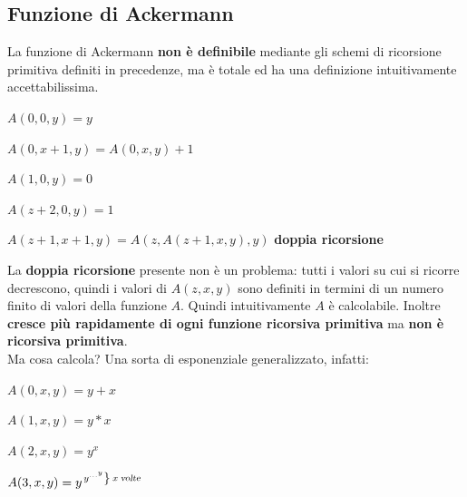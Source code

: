 \documentclass[10pt]{book}
\begin{document}
\subsection{Funzione di Ackermann}
La funzione di Ackermann \textbf{non è definibile} mediante gli schemi di ricorsione primitiva definiti in precedenze, ma è totale ed ha una definizione intuitivamente accettabilissima.

\begin{list}{}{}
	\item $A(0, 0, y) = y$
	\item $A(0, x + 1, y) = A(0, x, y) + 1$
	\item $A(1, 0, y) = 0$
	\item $A(z + 2, 0, y) = 1$
	\item $A(z + 1, x + 1, y) = A(z, A(z + 1, x, y), y)$ \textbf{doppia ricorsione}

\end{list}
La \textbf{doppia ricorsione} presente non è un problema: tutti i valori su cui si ricorre decrescono, quindi i valori di $A(z, x, y)$ sono definiti in termini di un numero finito di valori della funzione $A$. Quindi intuitivamente $A$ è calcolabile. Inoltre \textbf{cresce più rapidamente di ogni funzione ricorsiva primitiva} ma \textbf{non è ricorsiva primitiva}.\\
Ma cosa calcola? Una sorta di esponenziale generalizzato, infatti:
\begin{list}{}{}
	\item $A(0, x, y) = y + x$
	\item $A(1, x, y) = y * x$
	\item $A(2, x, y) = y^x$
	\item $A(3, x, y) = y^{\left.y^{\ldots^y}\right\} \:x\:\textsl{volte}}$
\end{list}
\end{document}
